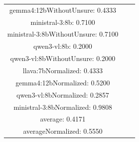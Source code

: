 \documentclass[a4paper]{article}
\begin{document}
\begin{tabular}{ccc}
gemma4:12bWithoutUnsure: 0.4333 \\ ministral-3:8b: 0.7100 \\ ministral-3:8bWithoutUnsure: 0.7100 \\ qwen3-vl:8b: 0.2000 \\ qwen3-vl:8bWithoutUnsure: 0.2000 \\ llava:7bNormalized: 0.4333 \\ gemma4:12bNormalized: 0.5200 \\ qwen3-vl:8bNormalized: 0.2857 \\ ministral-3:8bNormalized: 0.9808 \\ average: 0.4171 \\ averageNormalized: 0.5550 \end{minipage}\\
\end{tabular}

\vspace{5mm}
\end{document}
